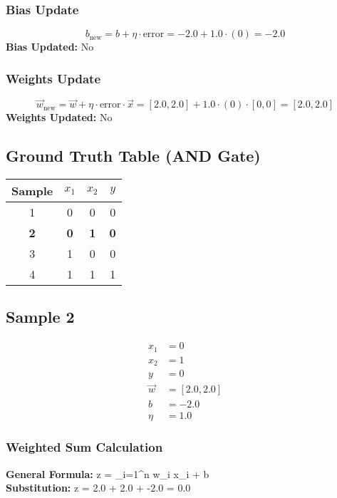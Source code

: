 \documentclass{article}
\begin{document}
\subsubsection*{Bias Update}
\[
b_{\text{new}} = b + \eta \cdot \text{error} = -2.0 + 1.0 \cdot (0) = -2.0
\]
\textbf{Bias Updated:} No

\subsubsection*{Weights Update}
\[
\vec{w}_{\text{new}} = \vec{w} + \eta \cdot \text{error} \cdot \vec{x} = 
[2.0, 2.0] + 1.0 \cdot (0) \cdot [0, 0] = 
[2.0, 2.0]
\]
\textbf{Weights Updated:} No

\subsection*{Ground Truth Table (AND Gate)}
\begin{center}
\begin{tabular}{|c|c|c|c|}
\hline
\textbf{Sample} & $x_1$ & $x_2$ & $y$ \\
\hline
1 & 0 & 0 & 0 \\
\hline
\rowcolor{yellow} \textbf{2} & \textbf{0} & \textbf{1} & \textbf{0} \\
\hline
3 & 1 & 0 & 0 \\
\hline
4 & 1 & 1 & 1 \\
\hline
\end{tabular}
\end{center}

\subsection*{Sample 2}
\begin{align*}
x_1 &= 0 \\
x_2 &= 1 \\
y &= 0 \\
\vec{w} &= [2.0, 2.0] \\
b &= -2.0 \\
\eta &= 1.0
\end{align*}

\subsubsection*{Weighted Sum Calculation}
\textbf{General Formula:} \quad
z = \sum_{i=1}^{n} w_i x_i + b
\\
\textbf{Substitution:} \quad
z = 2.0  + 2.0  + -2.0 = 0.0
\end{document}
